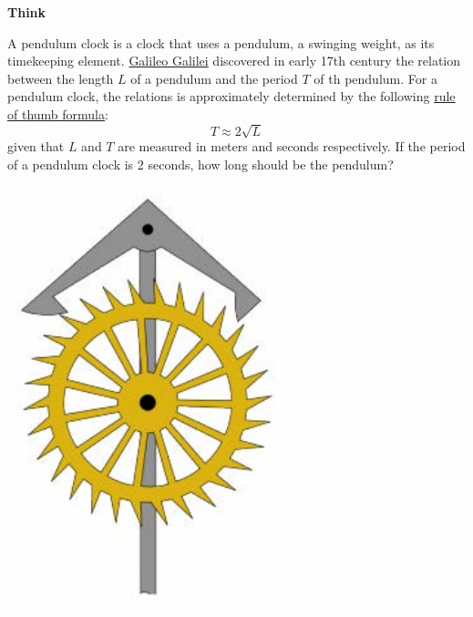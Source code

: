 \documentclass[en,12pt]{elegantbook}
\newenvironment{rmdthink}{
	\par\noindent
	{
		\makebox[-\width][r]{
			\footnotesize
			\color{green!90}\faLightbulbO
			\hspace*{3pt}
		}
			\textbf{
				\color{second}
				Think 
			}
    }
    \begin{shaded}
    \sffamily
}{
    \par\medskip\ignorespacesafterend
    \end{shaded}
}
\begin{document}
\begin{rmdthink}

\begin{multicols}{2}

A pendulum clock is a clock that uses a pendulum, a swinging weight, as its timekeeping element. \href{https://en.wikipedia.org/wiki/Galileo_Galilei}{Galileo Galilei} discovered in early 17th century the relation between the length \(L\) of a pendulum and the period \(T\) of th pendulum. For a pendulum clock, the relations is approximately determined by the following \href{https://en.wikipedia.org/wiki/Pendulum_(mathematics)}{rule of thumb formula}:
\[
T\approx 2\sqrt{L}
\]
given that \(L\) and \(T\) are measured in meters and seconds respectively. If the period of a pendulum clock is 2 seconds, how long should be the pendulum?

\begin{center}\includegraphics[width=0.8\linewidth]{figs/pendulum-clock} \end{center}

\end{multicols}

\end{rmdthink}
\end{document}
